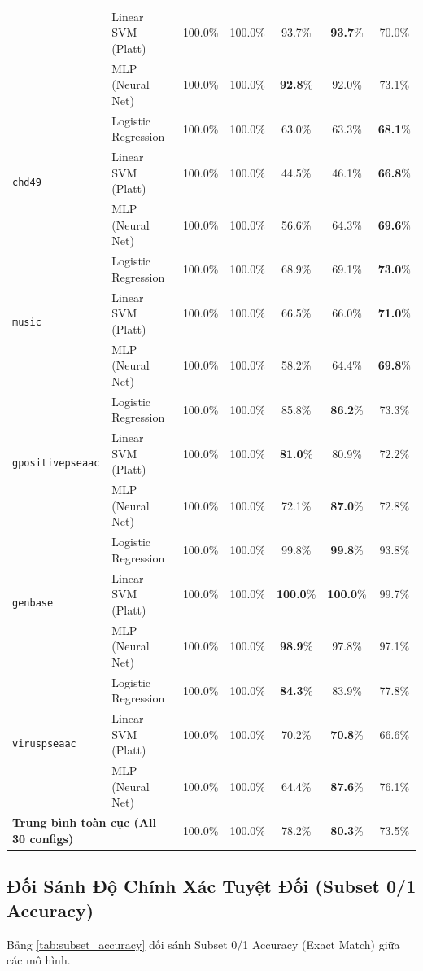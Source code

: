 \documentclass[10pt,a4paper,twoside]{article}
\begin{document}
\begin{table}[H]
{\begin{tabular}{llccccc}
 & Linear SVM (Platt) & 100.0\% & 100.0\% & 93.7\% & \textbf{93.7}\% & 70.0\% \\
 & MLP (Neural Net) & 100.0\% & 100.0\% & \textbf{92.8}\% & 92.0\% & 73.1\% \\
\midrule
\multirow{3}{*}{\texttt{chd49}} & Logistic Regression & 100.0\% & 100.0\% & 63.0\% & 63.3\% & \textbf{68.1}\% \\
 & Linear SVM (Platt) & 100.0\% & 100.0\% & 44.5\% & 46.1\% & \textbf{66.8}\% \\
 & MLP (Neural Net) & 100.0\% & 100.0\% & 56.6\% & 64.3\% & \textbf{69.6}\% \\
\midrule
\multirow{3}{*}{\texttt{music}} & Logistic Regression & 100.0\% & 100.0\% & 68.9\% & 69.1\% & \textbf{73.0}\% \\
 & Linear SVM (Platt) & 100.0\% & 100.0\% & 66.5\% & 66.0\% & \textbf{71.0}\% \\
 & MLP (Neural Net) & 100.0\% & 100.0\% & 58.2\% & 64.4\% & \textbf{69.8}\% \\
\midrule
\multirow{3}{*}{\texttt{gpositivepseaac}} & Logistic Regression & 100.0\% & 100.0\% & 85.8\% & \textbf{86.2}\% & 73.3\% \\
 & Linear SVM (Platt) & 100.0\% & 100.0\% & \textbf{81.0}\% & 80.9\% & 72.2\% \\
 & MLP (Neural Net) & 100.0\% & 100.0\% & 72.1\% & \textbf{87.0}\% & 72.8\% \\
\midrule
\multirow{3}{*}{\texttt{genbase}} & Logistic Regression & 100.0\% & 100.0\% & 99.8\% & \textbf{99.8}\% & 93.8\% \\
 & Linear SVM (Platt) & 100.0\% & 100.0\% & \textbf{100.0}\% & \textbf{100.0}\% & 99.7\% \\
 & MLP (Neural Net) & 100.0\% & 100.0\% & \textbf{98.9}\% & 97.8\% & 97.1\% \\
\midrule
\multirow{3}{*}{\texttt{viruspseaac}} & Logistic Regression & 100.0\% & 100.0\% & \textbf{84.3}\% & 83.9\% & 77.8\% \\
 & Linear SVM (Platt) & 100.0\% & 100.0\% & 70.2\% & \textbf{70.8}\% & 66.6\% \\
 & MLP (Neural Net) & 100.0\% & 100.0\% & 64.4\% & \textbf{87.6}\% & 76.1\% \\
\midrule
\multicolumn{2}{l}{\textbf{Trung bình toàn cục (All 30 configs)}} & 100.0\% & 100.0\% & 78.2\% & \textbf{80.3}\% & 73.5\% \\
\bottomrule
\end{tabular}%
}
\end{table}
\clearpage
\subsection{Đối Sánh Độ Chính Xác Tuyệt Đối (Subset 0/1 Accuracy)}
Bảng \ref{tab:subset_accuracy} đối sánh Subset 0/1 Accuracy (Exact Match) giữa các mô hình.
\end{document}
